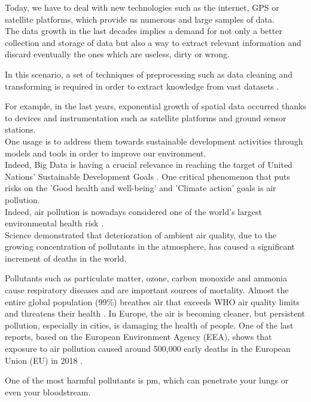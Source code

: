 Today, we have to deal with new technologies such as the internet, GPS or satellite platforms, which provide us numerous and large samples of data.\\ 
The data growth in the last decades implies a demand for not only a better collection and storage of data but also a way to extract relevant information and discard eventually the ones which are useless, dirty or wrong.\par
In this scenario, a set of techniques of preprocessing such as data cleaning and transforming is required in order to extract knowledge from vast datasets \cite{garcia2016big}.
\par
For example, in the last years, exponential growth of spatial data occurred thanks to devices and instrumentation such as satellite platforms and ground sensor stations. \\
One usage is to address them towards sustainable development activities through models and tools in order to improve our environment. \\
Indeed, Big Data is having a crucial relevance in reaching the target of United Nations’ Sustainable Development Goals  \cite{zhang2019orchestrating}.
One critical phenomenon that puts risks on the 'Good health and well-being' and 'Climate action' goals is air pollution.\\
Indeed, air pollution is nowadays considered one of the world's largest environmental health risk \cite{fuller2022pollution}.\\
Science demonstrated that deterioration of ambient air quality, due to the growing concentration of pollutants in the atmosphere, has caused a significant increment of deaths in the world.\par  
Pollutants such as particulate matter, ozone, carbon monoxide and ammonia cause respiratory diseases and are important sources of mortality.
Almost the entire global population (99\%) breathes air that exceeds WHO air quality limits and threatens their health \cite{WHOreport}.\newline
In Europe, the air is becoming cleaner, but persistent pollution, especially in cities, is damaging the health of people. One of the last reports, based on the European Environment Agency (EEA), shows that exposure to air pollution caused around 500,000 early deaths in the European Union (EU) in 2018  \cite{european2018air}.\par
One of the most harmful pollutants is \gls{pm}, which can penetrate your lungs or even your bloodstream.\newline 
